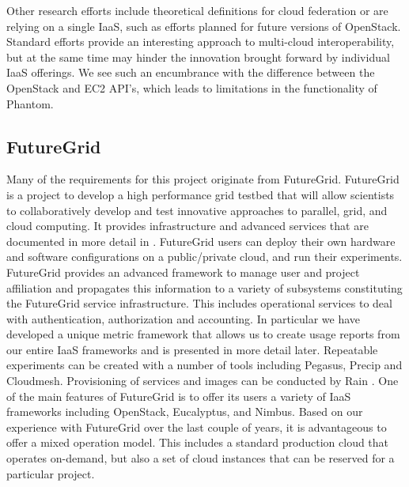 \documentclass{tex/sig-alternate-2013}
\begin{document}
Other research efforts include theoretical definitions for cloud
federation \cite{kurze2011cloudfederation} or are relying on a single
IaaS, such as efforts planned for future versions of
OpenStack. Standard efforts provide an interesting approach to
multi-cloud interoperability, but at the same time may hinder the
innovation brought forward by individual IaaS offerings. We see such
an encumbrance with the difference between the OpenStack and EC2
API's, which leads to limitations in the functionality of Phantom.


\subsection{FutureGrid}

Many of the requirements for this project originate from
FutureGrid. FutureGrid \cite{las2010gce,las12fg-bookchapter} is a
project to develop a high performance grid testbed that will allow
scientists to collaboratively develop and test innovative approaches
to parallel, grid, and cloud computing. It provides infrastructure and
advanced services that are documented in more detail in
\cite{vonLaszewski-bigdata-bookchapter2014} . FutureGrid users can
deploy their own hardware and software configurations on a
public/private cloud, and run their experiments. FutureGrid provides
an advanced framework to manage user and project affiliation and
propagates this information to a variety of subsystems constituting
the FutureGrid service infrastructure. This includes operational services to
deal with authentication, authorization and accounting. In particular
we have developed a unique metric framework
\cite{las08federated-cloud} that allows us to create usage reports
from our entire IaaS frameworks and is
presented in more detail later. Repeatable experiments can be created
with a number of tools including Pegasus, Precip and
Cloudmesh. Provisioning of services and images can be conducted by
Rain \cite{imagemanagement,fg-1295}.
One of the main features of FutureGrid is to offer its users a variety
of IaaS frameworks
\cite{comparisoncloud} including OpenStack, Eucalyptus,
and Nimbus. Based on our experience with
FutureGrid over the last couple of years, it is advantageous to offer
a mixed operation model. This includes a standard production cloud
that operates on-demand, but also a set of cloud instances that can be
reserved for a particular project. 
\end{document}
